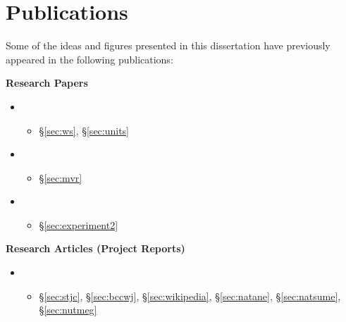 

\chapter*{Publications} %

Some of the ideas and figures presented in this dissertation have previously appeared in the following publications:

\bigskip

\textbf{Research Papers}
\begin{itemize}
  \item {}
  \begin{itemize}
    \item \S\ref{sec:ws}, \S\ref{sec:units}
  \end{itemize}
  \item {}
  \begin{itemize}
    \item \S\ref{sec:mvr}
  \end{itemize}
  \item {}
  \begin{itemize}
    \item \S\ref{sec:experiment2}
  \end{itemize}
\end{itemize}

\textbf{Research Articles (Project Reports)}
\begin{itemize}
  \item {}
  \begin{itemize}
    \item \S\ref{sec:stjc}, \S\ref{sec:bccwj}, \S\ref{sec:wikipedia}, \S\ref{sec:natane}, \S\ref{sec:natsume}, \S\ref{sec:nutmeg}
  \end{itemize}
\end{itemize}

